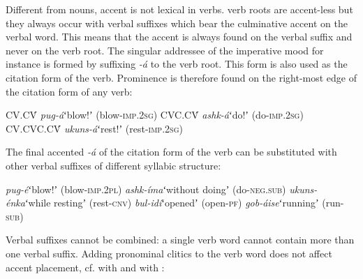 \documentclass[output=paper,modfonts,nonflat,hidelinks]{langsci/langscibook}
\begin{document}
Different from nouns, accent is not lexical in verbs.  verb roots are accent-less but they always occur with verbal suffixes which bear the culminative accent on the verbal word. This means that the accent is always found on the verbal suffix and never on the verb root. The singular addressee of the imperative mood for instance is formed by suffixing \textit{-á} to the verb root. This form is also used as the citation form of the verb. Prominence is therefore found on the right-most edge of the citation form of any verb:

\begin{exe}
\ex \begin{xlist}
\ex CV.CV́ \hspace{12mm}\textit{pug-á}\hspace{12mm}ʻblow!ʼ (blow-\textsc{imp}.2\textsc{sg})
\ex CVC.CV́ \hspace{9mm}\textit{ashk-á}\hspace{11mm}ʻdo!ʼ (do-\textsc{imp}.2\textsc{sg})
\ex CV.CVC.CV́ \hspace{3mm}\textit{ukuns-á}\hspace{10mm}ʻrest!ʼ (rest-\textsc{imp}.2\textsc{sg})
\end{xlist}
\end{exe}
The final accented \textit{-á} of the citation form of the verb can be substituted with other verbal suffixes of different syllabic structure:

\begin{exe}
\ex \begin{xlist}
\ex \textit{pug-é}\hspace{13mm}ʻblow!ʼ (blow-\textsc{imp}.2\textsc{pl}) \label{ex:Petrollino:pugé}
\ex \textit{ashk-íma}\hspace{7mm}ʻwithout doingʼ (do-\textsc{neg}.\textsc{sub})
\ex \textit{ukuns-énka}\hspace{4mm}ʻwhile restingʼ (rest-\textsc{cnv}) \label{ex:Petrollino:uskenka}
\ex \textit{bul-idí}\hspace{12mm}ʻopenedʼ (open-\textsc{pf})
\ex \textit{gob-áise}\hspace{10mm}ʻrunningʼ (run-\textsc{sub})
\end{xlist} \label{ex:Petrollino:grammaticalstress}
\end{exe}

Verbal suffixes cannot be combined: a single verb word cannot contain more than one verbal suffix. Adding pronominal  clitics to the verb word does not affect accent placement, cf.  with  and  with :
\end{document}

